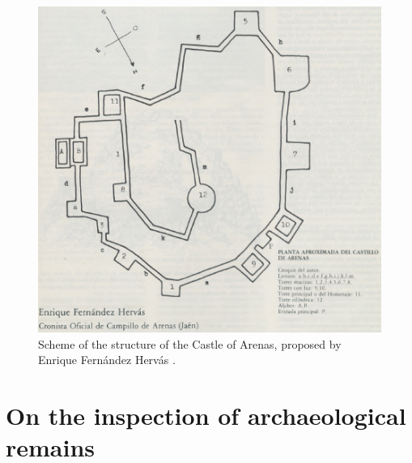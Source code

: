 \begin{figure}[ht]
  \centering
  \includegraphics[width=\linewidth]{figs/castle_puerta_arenas/castle_ideation_scheme.PNG}
  \caption{Scheme of the structure of the Castle of Arenas, proposed by Enrique Fernández Hervás \cite{fernandez_hervas_castillo_1986}.}
  \label{fig:castle_ideation_scheme}
\end{figure}

\section{On the inspection of archaeological remains}

